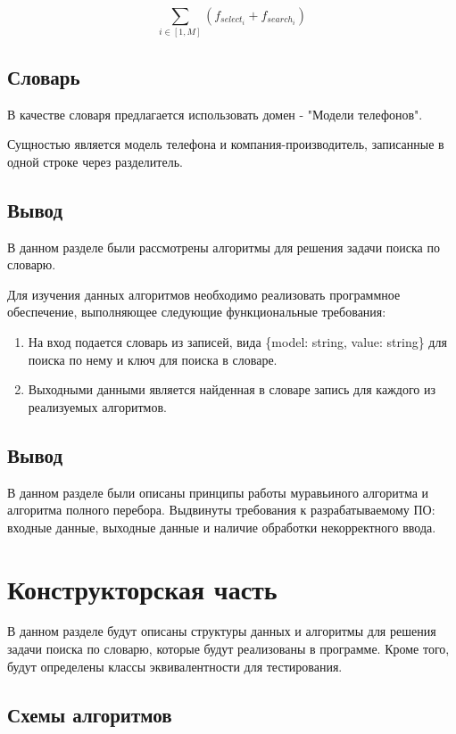 \documentclass[12pt]{report}
\begin{document}
    \begin{equation}
    	\sum_{i \in [1, M]} (f_{select_i} + f_{search_i})
    	\label{eq:freq}
    \end{equation}
    
    \section{Словарь}
    В качестве словаря предлагается использовать домен - "Модели телефонов".

 	Сущностью является модель телефона и компания-производитель, записанные в одной строке через разделитель.
    
    \section{Вывод}
    В данном разделе были рассмотрены алгоритмы для решения задачи поиска по словарю.
    
    Для изучения данных алгоритмов необходимо реализовать программное обеспечение, выполняющее следующие функциональные требования:
    \begin{enumerate}
    	\item На вход подается словарь из записей, вида \{model: string, value: string\} для поиска по нему и ключ для поиска в словаре.
    	\item Выходными данными является найденная в словаре запись для каждого из реализуемых алгоритмов.
    \end{enumerate}

	\section*{Вывод}
	В данном разделе были описаны принципы работы муравьиного алгоритма и алгоритма полного перебора.
	Выдвинуты требования к разрабатываемому ПО: входные данные, выходные данные и наличие обработки некорректного ввода.
	\newpage
	
	\chapter{Конструкторская часть}
	
	В данном разделе будут описаны структуры данных и алгоритмы для решения задачи поиска по словарю,
	которые будут реализованы в программе.
	Кроме того, будут определены классы эквивалентности для тестирования.
	
	\section{Схемы алгоритмов}
	
\end{document}
